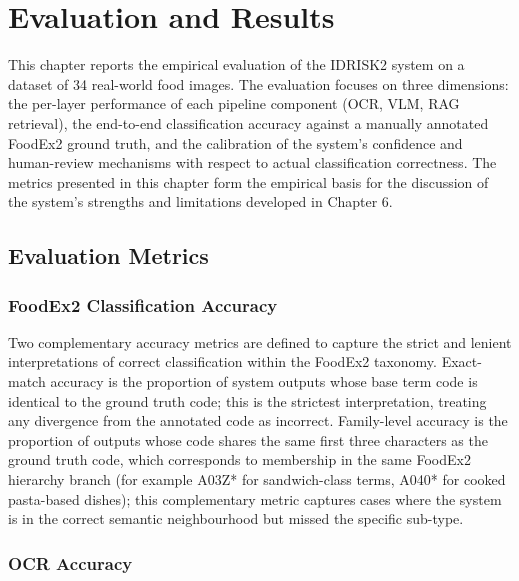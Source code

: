 \hypertarget{evaluation-and-results}{%
\chapter{Evaluation and Results}\label{evaluation-and-results}}

This chapter reports the empirical evaluation of the IDRISK2 system on a dataset of 34 real-world food images. The evaluation focuses on three dimensions: the per-layer performance of each pipeline component (OCR, VLM, RAG retrieval), the end-to-end classification accuracy against a manually annotated FoodEx2 ground truth, and the calibration of the system's confidence and human-review mechanisms with respect to actual classification correctness. The metrics presented in this chapter form the empirical basis for the discussion of the system's strengths and limitations developed in Chapter 6.

\hypertarget{evaluation-metrics}{%
\section{Evaluation Metrics}\label{evaluation-metrics}}

\hypertarget{foodex2-classification-accuracy}{%
\subsection{FoodEx2 Classification Accuracy}\label{foodex2-classification-accuracy}}

Two complementary accuracy metrics are defined to capture the strict and lenient interpretations of correct classification within the FoodEx2 taxonomy. Exact-match accuracy is the proportion of system outputs whose base term code is identical to the ground truth code; this is the strictest interpretation, treating any divergence from the annotated code as incorrect. Family-level accuracy is the proportion of outputs whose code shares the same first three characters as the ground truth code, which corresponds to membership in the same FoodEx2 hierarchy branch (for example A03Z* for sandwich-class terms, A040* for cooked pasta-based dishes); this complementary metric captures cases where the system is in the correct semantic neighbourhood but missed the specific sub-type.

\hypertarget{ocr-accuracy}{%
\subsection{OCR Accuracy}\label{ocr-accuracy}}

